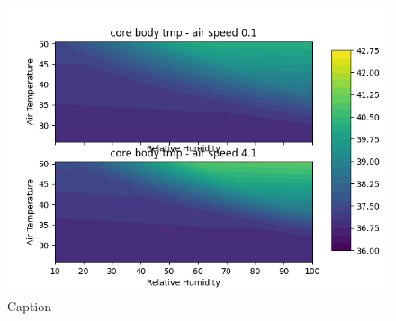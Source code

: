 \begin{figure}
    \centering
    \includegraphics[width=\textwidth]{figures/core_body_tmp.png}
    \caption{Caption}
    \label{fig:core_body_tmp}
\end{figure}



